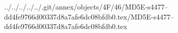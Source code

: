 ../../../../../.git/annex/objects/4F/46/MD5E-s4477--dd4fe9766d00337d8a7afe6dc08bfdb0.tex/MD5E-s4477--dd4fe9766d00337d8a7afe6dc08bfdb0.tex